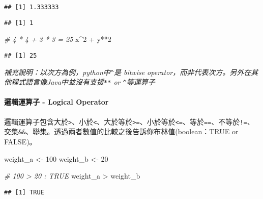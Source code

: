 \documentclass[]{article}
\newenvironment{Shaded}{\begin{snugshade}}{\end{snugshade}}
\newcommand{\DecValTok}[1]{\textcolor[rgb]{0.00,0.00,0.81}{{#1}}}
\newcommand{\StringTok}[1]{\textcolor[rgb]{0.31,0.60,0.02}{{#1}}}
\newcommand{\CommentTok}[1]{\textcolor[rgb]{0.56,0.35,0.01}{\textit{{#1}}}}
\newcommand{\NormalTok}[1]{{#1}}
\let\oldparagraph\paragraph
\renewcommand{\paragraph}[1]{\oldparagraph{#1}\mbox{}}
\begin{document}
\begin{verbatim}
## [1] 1.333333
\end{verbatim}

\begin{Shaded}
\end{Shaded}

\begin{verbatim}
## [1] 1
\end{verbatim}

\begin{Shaded}
\begin{Highlighting}[]
\CommentTok{# 4 * 4 + 3 * 3 = 25}
\NormalTok{x^}\DecValTok{2} \NormalTok{+}\StringTok{ }\NormalTok{y**}\DecValTok{2}
\end{Highlighting}
\end{Shaded}

\begin{verbatim}
## [1] 25
\end{verbatim}

\emph{補充說明：以次方為例，python中\texttt{\^{}}是 bitwise
operator，而非代表次方。另外在其他程式語言像Java中並沒有支援\texttt{**}
or \texttt{\^{}}等運算子}

\paragraph{邏輯運算子 - Logical Operator}\label{---logical-operator}

邏輯運算子包含大於\texttt{\textgreater{}}、小於\texttt{\textless{}}、大於等於\texttt{\textgreater{}=}、小於等於\texttt{\textless{}=}、等於\texttt{==}、不等於\texttt{!=}、交集\texttt{\&\&}、聯集\texttt{\textbar{}\textbar{}}。透過兩者數值的比較之後告訴你布林值(boolean：TRUE
or FALSE)。

\begin{Shaded}
\begin{Highlighting}[]
\NormalTok{weight_a <-}\StringTok{ }\DecValTok{100}
\NormalTok{weight_b <-}\StringTok{ }\DecValTok{20}

\CommentTok{# 100 > 20 : TRUE}
\NormalTok{weight_a >}\StringTok{ }\NormalTok{weight_b}
\end{Highlighting}
\end{Shaded}

\begin{verbatim}
## [1] TRUE
\end{verbatim}
\end{document}
